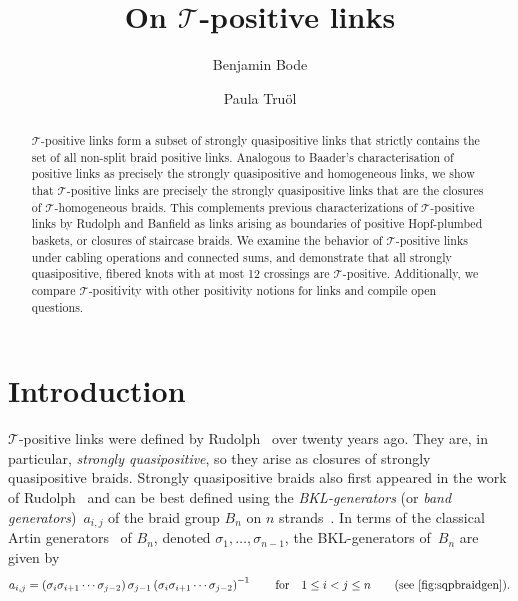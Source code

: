 \documentclass{amsart}
\title{On $\mathcal{T}$-positive links}
\author{Benjamin Bode}
\author{Paula Truöl}
\theoremstyle{definition}
\theoremstyle{remark}
\theoremstyle{plain}
\newcommand{\T}{\mathcal{T}}
\newcommand{\sigij}{a_{i,j}}
\begin{document}
\makeatletter
{}
\makeatother%



\begin{abstract} 
$\T$-positive links form a subset of strongly quasipositive links that strictly contains the set of all non-split braid positive links. Analogous to Baader's characterisation of positive links as precisely the strongly quasipositive and homogeneous links, we show that $\T$-positive links are precisely the strongly quasipositive links that are the closures of $\T$-homogeneous braids. This complements previous characterizations of $\T$-positive links by Rudolph and Banfield as links arising as boundaries of positive Hopf-plumbed baskets, or closures of staircase braids. We examine the behavior of $\T$-positive links under cabling operations and connected sums, and demonstrate that all strongly quasipositive, fibered knots with at most 12 crossings are $\T$-positive. Additionally, we compare $\T$-positivity with other positivity notions for links and compile open questions.
\end{abstract}

\maketitle

\section{Introduction} 

$\mathcal{T}$-positive links were defined by Rudolph~\cite{Rudolph_Hopf_plumbing} over twenty years ago. They are, in particular, \emph{strongly quasipositive}, so they arise as closures of strongly quasipositive braids. Strongly quasipositive braids also first appeared in the work of Rudolph~\cite{Rudolph_1983,rudolph_linkpolys} and can be best defined using the \emph{BKL-generators} (or \emph{band generators})~$a_{i,j}$ of the braid group $B_n$ on $n$ strands~\cite{birmankolee}. In terms of the classical Artin generators~\cite{artin_1925} of $B_n$, denoted $\sigma_1, \dots, \sigma_{n-1}$, the BKL-generators of~$B_n$ are given by 
\begin{align*}
\sigij = \left(\sigma_i \sigma_{i+1} \cdots \sigma_{j-2} \right) \sigma_{j-1} \left(\sigma_i \sigma_{i+1} \cdots \sigma_{j-2} \right)^{-1} 
\qquad \text{for} \quad 1 \leq i < j \leq n \qquad \text{(see \Cref{fig:sqpbraidgen})}.
\end{align*}
\end{document}
